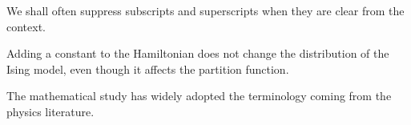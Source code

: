 \begin{remark}
    We shall often suppress subscripts and superscripts when they are clear from the context.
\end{remark}

\begin{remark}
    Adding a constant to the Hamiltonian does not change the distribution of the Ising model,
    even though it affects the partition function.
\end{remark}

\begin{remark}
    The mathematical study has widely adopted the terminology coming from the physics
    literature.
\end{remark}
